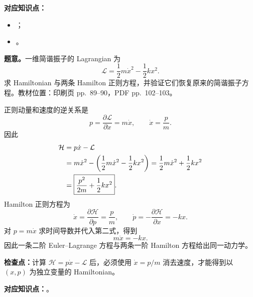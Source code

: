 
\textbf{对应知识点：}
\begin{itemize}[leftmargin=*]
  \item {}；
  \item {}。
\end{itemize}

\textbf{题意。}一维简谐振子的 Lagrangian 为
\[
  \mathcal L=\frac12m\dot x^2-\frac12kx^2.
\]
求 Hamiltonian 与两条 Hamilton 正则方程，并验证它们恢复原来的简谐振子方程。教材位置：印刷页 pp.~89--90，PDF pp.~102--103。

\begin{checkedsolution}
正则动量和速度的逆关系是
\begin{equation}
  p=\frac{\partial\mathcal L}{\partial\dot x}=m\dot x,
  \qquad
  \dot x=\frac pm.
  \label{eq:QM-C02-S05-E00-momentum}
\end{equation}
因此
\begin{align}
  \mathcal H
  &=p\dot x-\mathcal L \notag\\
  &=m\dot x^2-\left(\frac12m\dot x^2-\frac12kx^2\right)
    =\frac12m\dot x^2+\frac12kx^2 \notag\\
  &=\boxed{\frac{p^2}{2m}+\frac12kx^2}.
  \label{eq:QM-C02-S05-E00-hamiltonian}
\end{align}
Hamilton 正则方程为
\begin{equation}
  \dot x=\frac{\partial\mathcal H}{\partial p}=\frac pm,
  \qquad
  \dot p=-\frac{\partial\mathcal H}{\partial x}=-kx.
  \label{eq:QM-C02-S05-E00-hamilton-equations}
\end{equation}
对 $p=m\dot x$ 求时间导数并代入第二式，得到
\begin{equation}
  \boxed{m\ddot x=-kx.}
  \label{eq:QM-C02-S05-E00-newton-equation}
\end{equation}
因此一条二阶 Euler--Lagrange 方程与两条一阶 Hamilton 方程给出同一动力学。
\end{checkedsolution}

\textbf{检查点：}计算 $\mathcal H=p\dot x-\mathcal L$ 后，必须使用 $\dot x=p/m$ 消去速度，才能得到以 $(x,p)$ 为独立变量的 Hamiltonian。


\textbf{对应知识点：}。

